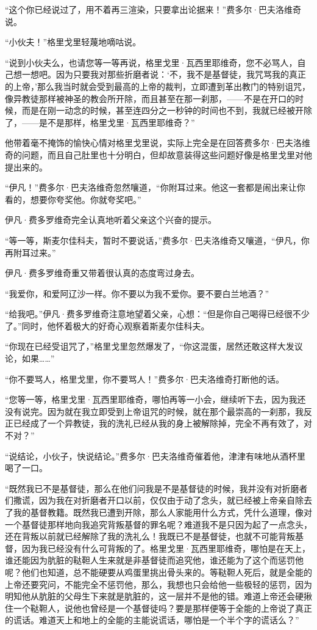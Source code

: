 \par “这个你已经说过了，用不着再三渲染，只要拿出论据来！”费多尔·巴夫洛维奇说。
\par “小伙夫！”格里戈里轻蔑地嘀咕说。
\par “说到小伙夫么，也请您等一等再说，格里戈里·瓦西里耶维奇，您不必骂人，自己想一想吧。因为只要我对那些折磨者说：‘不，我不是基督徒，我咒骂我的真正的上帝，’那么我当时就会受到最高的上帝的裁判，立即遭到革出教门的特别诅咒，像异教徒那样被神圣的教会所开除，而且甚至在那一刹那，——不是在开口的时候，而是在刚一动念的时候，甚至连四分之一秒钟的时间也不到，我就已经被开除了，——是不是那样，格里戈里·瓦西里耶维奇？”
\par 他带着毫不掩饰的愉快心情对格里戈里说，实际上完全是在回答费多尔·巴夫洛维奇的问题，而且自己肚里也十分明白，但却故意装得这些问题好像是格里戈里对他提出来的。
\par “伊凡！”费多尔·巴夫洛维奇忽然嚷道，“你附耳过来。他这一套都是闹出来让你看的，想要你夸奖他。你就夸奖吧。”
\par 伊凡·费多罗维奇完全认真地听着父亲这个兴奋的提示。
\par “等一等，斯麦尔佳科夫，暂时不要说话，”费多尔·巴夫洛维奇又嚷道，“伊凡，你再附耳过来。”
\par 伊凡·费多罗维奇重又带着很认真的态度弯过身去。
\par “我爱你，和爱阿辽沙一样。你不要以为我不爱你。要不要白兰地酒？”
\par “给我吧。”伊凡·费多罗维奇注意地望着父亲，心想：“但是你自己喝得已经很不少了。”同时，他怀着极大的好奇心观察着斯麦尔佳科夫。
\par “你现在已经受诅咒了，”格里戈里忽然爆发了，“你这混蛋，居然还敢这样大发议论，如果……”
\par “你不要骂人，格里戈里，你不要骂人！”费多尔·巴夫洛维奇打断他的话。
\par “您等一等，格里戈里·瓦西里耶维奇，哪怕再等一小会，继续听下去，因为我还没有说完。因为就在我立即受到上帝诅咒的时候，就在那个最崇高的一刹那，我反正已经成了一个异教徒，我的洗礼已经从我的身上被解除掉，完全不再有效了，对不对？”
\par “说结论，小伙子，快说结论。”费多尔·巴夫洛维奇催着他，津津有味地从酒杯里喝了一口。
\par “既然我已不是基督徒，那么在他们问我是不是基督徒的时候，我并没有对折磨者们撒谎，因为我在对折磨者开口以前，仅仅由于动了念头，就已经被上帝亲自除去了我的基督教籍。既然我已遭到开除，那么人家能用什么方式，凭什么道理，像对一个基督徒那样地向我追究背叛基督的罪名呢？难道我不是只因为起了一点念头，还在背叛以前就已经解除了我的洗礼么！我既已不是基督徒，也就不可能背叛基督，因为我已经没有什么可背叛的了。格里戈里·瓦西里耶维奇，哪怕是在天上，谁还能因为肮脏的鞑靼人生来就是非基督徒而追究他，谁还能为了这个而惩罚他呢？他们也知道，总不能硬要从鸡蛋里挑出骨头来的。等鞑靼人死后，就是全能的上帝还要究问，不能完全不惩罚他，那么，我想也只会给他一些极轻的惩罚，因为明知他从肮脏的父母生下来就是肮脏的，这一层并不是他的错。难道上帝还会硬揪住一个鞑靼人，说他也曾经是一个基督徒吗？要是那样便等于全能的上帝说了真正的谎话。难道天上和地上的全能的主能说谎话，哪怕是一个半个字的谎话么？”

